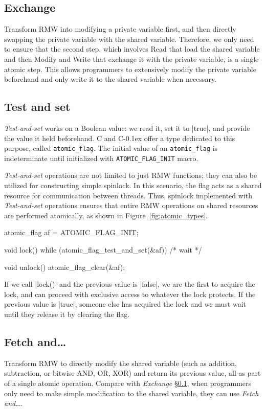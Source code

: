 \documentclass[fontsize=10pt, oneside]{scrartcl}
\newcommand{\monobox}[1]{\mbox{\texttt{#1}}}
\newcommand{\cplusplus}[1]{C\kern-0.1ex\raisebox{0.15ex}{\texttt{++}}}
\newcommand{\clang}[1]{C}
\newcommand{\fig}[1]{Figure~\ref{#1}}
\newcommand{\introduce}[1]{\textit{#1}}
\newcommand{\secref}[1]{\hyperref[#1]{\textsc{\S}\ref*{#1}}}
\begin{document}
\subsection{Exchange}
\label{exchange}
Transform \textsc{RMW} into modifying a private variable first, 
and then directly swapping the private variable with the shared variable. 
Therefore, we only need to ensure that the second step, 
which involves Read that load the shared variable and then Modify and Write that exchange it with the private variable, 
is a single atomic step.
This allows programmers to extensively modify the private variable beforehand and only write it to the shared variable when necessary. 

\subsection{Test and set}
\label{Testandset}
\introduce{Test-and-set} works on a Boolean value:
we read it, set it to \cpp|true|, and provide the value it held beforehand.
\clang{} and \cplusplus{} offer a type dedicated to this purpose, called \monobox{atomic\_flag}.
The initial value of an \monobox{atomic\_flag} is indeterminate until initialized with \monobox{ATOMIC\_FLAG\_INIT} macro.

\introduce{Test-and-set} operations are not limited to just \textsc{RMW} functions; 
they can also be utilized for constructing simple spinlock. 
In this scenario, the flag acts as a shared resource for communication between threads. 
Thus, spinlock implemented with \introduce{Test-and-set} operations ensures that entire \textsc{RMW} operations on shared resources are performed atomically, as shown in \fig{fig:atomic_types}.
\label{spinlock}
\begin{ccode}
atomic_flag af = ATOMIC_FLAG_INIT;

void lock()
{
    while (atomic_flag_test_and_set(&af)) { /* wait */ }
}

void unlock() { atomic_flag_clear(&af); }
\end{ccode}
If we call \cc|lock()| and the previous value is \cc|false|,
we are the first to acquire the lock,
and can proceed with exclusive access to whatever the lock protects.
If the previous value is \cc|true|,
someone else has acquired the lock and we must wait until they release it by clearing the flag.

\subsection{Fetch and…}
Transform \textsc{RMW} to directly modify the shared variable (such as addition, subtraction,
or bitwise \textsc{AND}, \textsc{OR}, \textsc{XOR}) and return its previous value, 
all as part of a single atomic operation. 
Compare with \introduce{Exchange} \secref{exchange}, when programmers only need to make simple modification to the shared variable, 
they can use \introduce{Fetch and…}.
\end{document}
